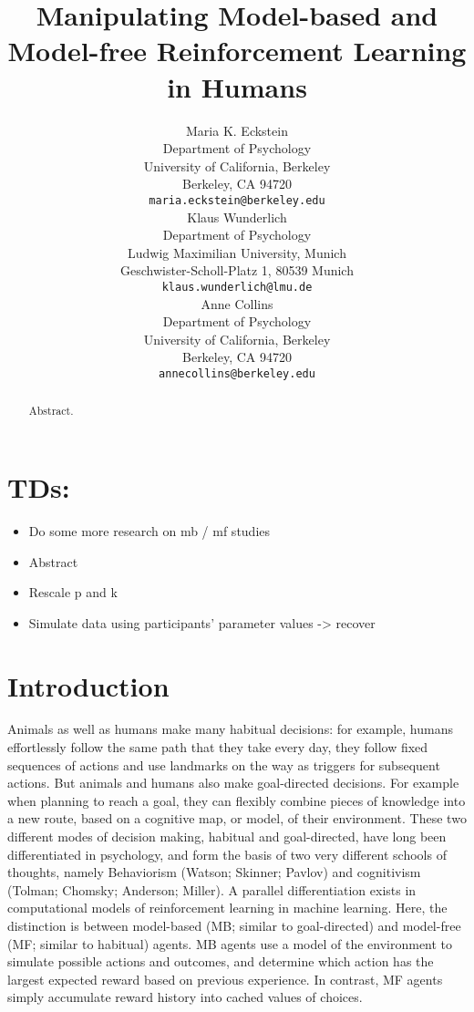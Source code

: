 \documentclass[11pt]{article} %
\title{Manipulating Model-based and Model-free Reinforcement Learning in Humans}
\author{
Maria K. Eckstein \\
Department of Psychology \\
University of California, Berkeley \\
Berkeley, CA 94720 \\
\texttt{maria.eckstein@berkeley.edu} \\
\And
Klaus Wunderlich \\
Department of Psychology \\
Ludwig Maximilian University, Munich \\
Geschwister-Scholl-Platz 1, 80539 Munich \\
\texttt{klaus.wunderlich@lmu.de} \\
\And
Anne Collins \\
Department of Psychology\\
University of California, Berkeley \\
Berkeley, CA 94720  \\
\texttt{annecollins@berkeley.edu} \\
}
\begin{document}
\maketitle

\begin{abstract}
Abstract. 
\end{abstract}




\section*{TDs:}
\begin{itemize}
	\item Do some more research on mb / mf studies
	\item Abstract
	\item Rescale p and k
	\item Simulate data using participants' parameter values -> recover
\end{itemize}

\startmain

\section{Introduction}

Animals as well as humans make many habitual decisions: for example, humans effortlessly follow the same path that they take every day, they follow fixed sequences of actions and use landmarks on the way as triggers for subsequent actions. But animals and humans also make goal-directed decisions. For example when planning to reach a goal, they can flexibly combine pieces of knowledge into a new route, based on a cognitive map, or model, of their environment. These two different modes of decision making, habitual and goal-directed, have long been differentiated in psychology, and form the basis of two very different schools of thoughts, namely Behaviorism (Watson; Skinner; Pavlov) and cognitivism (Tolman; Chomsky; Anderson; Miller). A parallel differentiation exists in computational models of reinforcement learning in machine learning. Here, the distinction is between model-based (MB; similar to goal-directed) and model-free (MF; similar to habitual) agents.  MB agents use a model of the environment to simulate possible actions and outcomes, and determine which action has the largest expected reward based on previous experience. In contrast, MF agents simply accumulate reward history into cached values of choices. 
\end{document}

